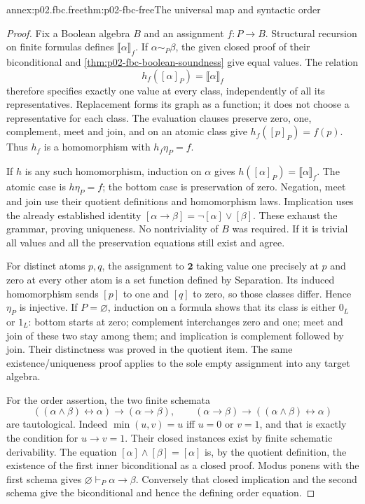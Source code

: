 \begin{annexitem}{annex:p02.fbc.free}{thm:p02-fbc-free}{The universal map and syntactic order}
\begin{proof}
Fix a Boolean algebra \(B\) and an assignment \(f:P\to B\).
Structural recursion on finite formulas defines
\(\llbracket\alpha\rrbracket_f\).
If \(\alpha\sim_P\beta\), the given closed proof of their
biconditional and \cref{thm:p02-fbc-boolean-soundness} give equal
values. The relation
\[
 h_f([\alpha]_P)=\llbracket\alpha\rrbracket_f
\]
therefore specifies exactly one value at every class, independently
of all its representatives. Replacement forms its graph as a function;
it does not choose a representative for each class.
The evaluation clauses preserve zero, one, complement, meet and join,
and on an atomic class give \(h_f([p]_P)=f(p)\).
Thus \(h_f\) is a homomorphism with \(h_f\eta_P=f\).

If \(h\) is any such homomorphism, induction on \(\alpha\) gives
\(h([\alpha]_P)=\llbracket\alpha\rrbracket_f\).
The atomic case is \(h\eta_P=f\); the bottom case is preservation
of zero. Negation, meet and join use their quotient definitions and
homomorphism laws. Implication uses the already established identity
\([\alpha\to\beta]=\neg[\alpha]\vee[\beta]\).
These exhaust the grammar, proving uniqueness.
No nontriviality of \(B\) was required. If it is trivial all values
and all the preservation equations still exist and agree.

For distinct atoms \(p,q\), the assignment to \(\mathbf2\) taking
value one precisely at \(p\) and zero at every other atom is a set
function defined by Separation. Its induced homomorphism sends
\([p]\) to one and \([q]\) to zero, so those classes differ.
Hence \(\eta_P\) is injective.
If \(P=\varnothing\), induction on a formula shows that its class
is either \(0_L\) or \(1_L\): bottom starts at zero; complement
interchanges zero and one; meet and join of these two stay among them;
and implication is complement followed by join.
Their distinctness was proved in the quotient item.
The same existence/uniqueness proof applies to the sole empty assignment
into any target algebra.

For the order assertion, the two finite schemata
\[
 ((\alpha\land\beta)\leftrightarrow\alpha)\to(\alpha\to\beta),
 \qquad
 (\alpha\to\beta)\to((\alpha\land\beta)\leftrightarrow\alpha)
\]
are tautological. Indeed \(\min(u,v)=u\) iff \(u=0\) or \(v=1\),
and that is exactly the condition for \(u\to v=1\).
Their closed instances exist by finite schematic derivability.
The equation \([\alpha]\wedge[\beta]=[\alpha]\) is, by the
quotient definition, the existence of the first inner biconditional
as a closed proof. Modus ponens with the first schema gives
\(\varnothing\vdash_P\alpha\to\beta\).
Conversely that closed implication and the second schema give
the biconditional and hence the defining order equation.
\end{proof}
\end{annexitem}

